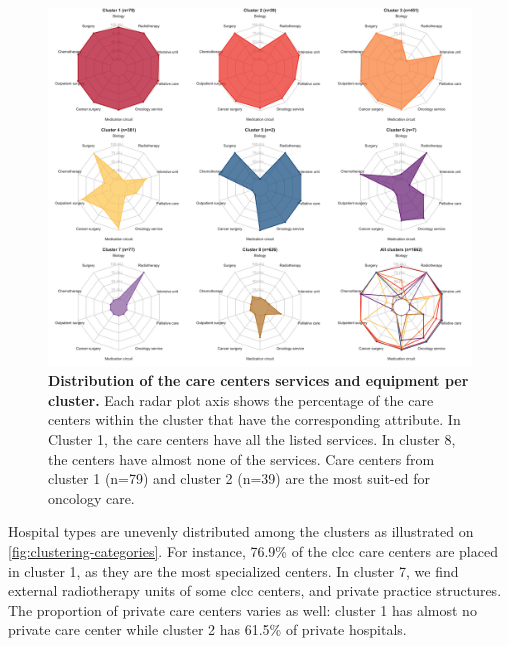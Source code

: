 \begin{figure}[H]
    \includegraphics[width=\textwidth]{images/camion/fig1_clusters_services.png}
    \centering
    \caption{
        \textbf{Distribution of the care centers services and equipment per cluster.} Each radar plot axis shows the percentage of the care centers within the cluster that have the corresponding attribute. In Cluster 1, the care centers have all the listed services. In cluster 8, the centers have almost none of the services. Care centers from cluster 1 (n=79) and cluster 2 (n=39) are the most suit-ed for oncology care.
    }
    \label{fig:clustering-spider}
\end{figure}

Hospital types are unevenly distributed among the clusters as illustrated on \cref{fig:clustering-categories}. For instance, 76.9\% of the \ac{clcc} care centers are placed in cluster 1, as they are the most specialized centers. In cluster 7, we find external radiotherapy units of some \ac{clcc} centers, and private practice structures. The proportion of private care centers varies as well: cluster 1 has almost no private care center while cluster 2 has 61.5\% of private hospitals.

